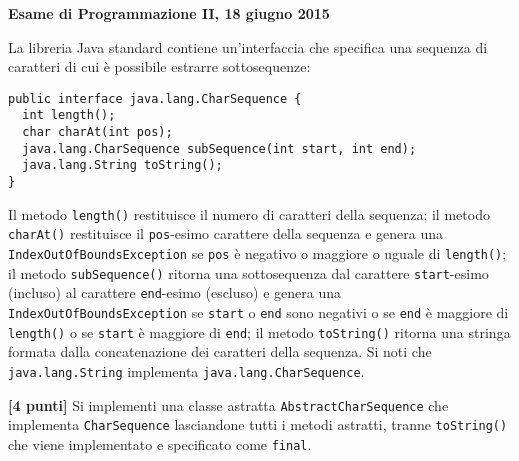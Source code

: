\documentclass{article}[10pt]
\newcounter{esnu}
\newenvironment{esercizio}{\medskip \noindent {\bf Esercizio\addtocounter{esnu}{1} \arabic{esnu}}}{}
\begin{document}
\begin{center} {\bf Esame di Programmazione II, 18 giugno 2015}\end{center}

La libreria Java standard contiene un'interfaccia che specifica una sequenza di caratteri di cui \`e possibile
estrarre sottosequenze:

{\small
\begin{verbatim}
public interface java.lang.CharSequence {
  int length();
  char charAt(int pos);
  java.lang.CharSequence subSequence(int start, int end);
  java.lang.String toString();
}
\end{verbatim}
}

\noindent
Il metodo \texttt{length()} restituisce il numero di caratteri della sequenza; il metodo \texttt{charAt()}
restituisce il \texttt{pos}-esimo carattere della sequenza e genera una \texttt{IndexOutOfBoundsException} se
\texttt{pos} \`e negativo o maggiore o uguale di \texttt{length()}; il metodo \texttt{subSequence()}
ritorna una sottosequenza dal carattere \texttt{start}-esimo (incluso) al carattere \texttt{end}-esimo (escluso)
e genera una \texttt{IndexOutOfBoundsException} se \texttt{start} o \texttt{end} sono
negativi o se \texttt{end} \`e maggiore di \texttt{length()} o se \texttt{start} \`e maggiore di \texttt{end};
il metodo \texttt{toString()} ritorna una stringa formata dalla concatenazione dei caratteri della sequenza.
Si noti che \texttt{java.lang.String} implementa \texttt{java.lang.CharSequence}.

\begin{esercizio}
\textbf{[4 punti]}
%
Si implementi una classe astratta \texttt{AbstractCharSequence}
che implementa \texttt{CharSequence} lasciandone tutti i metodi
astratti, tranne \texttt{toString()} che viene implementato e specificato come \texttt{final}.
\end{esercizio}
\end{document}
